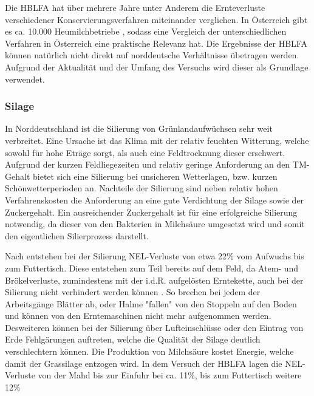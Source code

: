 Die \ac{HBLFA} hat über mehrere Jahre unter Anderem die Ernteverluste verschiedener Konservierungsverfahren miteinander verglichen.
In Österreich gibt es ca. 10.000 Heumilchbetriebe \parencite[75]{fritz2018ansatz}, sodass eine Vergleich der unterschiedlichen Verfahren in Österreich eine praktische Relevanz hat.
Die Ergebnisse der \ac{HBLFA} können natürlich nicht direkt auf norddeutsche Verhältnisse übetragen werden.
Aufgrund der Aktualität und der Umfang des Versuchs wird dieser als Grundlage verwendet. 


\subsubsection{Silage}
\label{subsub:Silage}
In Norddeutschland ist die Silierung von Grünlandaufwüchsen sehr weit verbreitet.
Eine Ursache ist das Klima mit der relativ feuchten Witterung, welche sowohl für hohe Eträge sorgt, als auch eine Feldtrocknung dieser erschwert.
Aufgrund der kurzen Feldliegezeiten und relativ geringe Anforderung an den \ac{TM}-Gehalt bietet sich eine Silierung bei unsicheren Wetterlagen, bzw. kurzen Schönwetterperioden an.
Nachteile der Silierung sind neben relativ hohen Verfahrenskosten die Anforderung an eine gute Verdichtung der Silage sowie der Zuckergehalt.
Ein ausreichender Zuckergehalt ist für eine erfolgreiche Silierung notwendig, da dieser von den Bakterien in Milchsäure umgesetzt wird und somit den eigentlichen Silierprozess darstellt.

Nach \textcite[30]{fritz2018wirtschaftliche} entstehen bei der Silierung \ac{NEL}-Verluste von etwa 22\% vom Aufwuchs bis zum Futtertisch.
Diese entstehen zum Teil bereits auf dem Feld, da Atem- und Brökelverluste, zumindestens mit der i.d.R. aufgelösten Erntekette, auch bei der Silierung nicht verhindert werden können \parencite[58f]{gruber2015einfluss}.
So brechen bei jedem der Arbeitsgänge Blätter ab, oder Halme "fallen" von den Stoppeln auf den Boden und können von den Erntemaschinen nicht mehr aufgenommen werden.
Desweiteren können bei der Silierung über Lufteinschlüsse oder den Eintrag von Erde Fehlgärungen auftreten, welche die Qualität der Silage deutlich verschlechtern können.
Die Produktion von Milchsäure kostet Energie, welche damit der Grassilage entzogen wird\parencite[61]{gruber2015einfluss}.
In dem Versuch der \ac{HBLFA} lagen die \ac{NEL}-Verluste von der Mahd bis zur Einfuhr bei ca. 11\%, bis zum Futtertisch weitere 12\% \parencite[30]{fritz2018wirtschaftliche}


